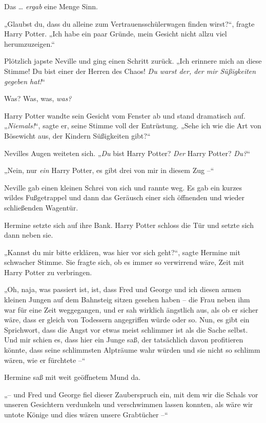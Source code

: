 Das … \emph{ergab} eine Menge Sinn. 

„Glaubst du, dass du alleine zum Vertrauensschülerwagen finden wirst?“, fragte Harry Potter. „Ich habe ein paar Gründe, mein Gesicht nicht allzu viel herumzuzeigen.“ 

Plötzlich japste Neville und ging einen Schritt zurück. „Ich erinnere mich an diese Stimme! Du bist einer der Herren des Chaos! \emph{Du warst der, der mir Süßigkeiten gegeben hat!}“ 

Was? Was, was, \emph{was?} 

Harry Potter wandte sein Gesicht vom Fenster ab und stand dramatisch auf. „\emph{Niemals!}“, sagte er, seine Stimme voll der Entrüstung. „Sehe ich wie die Art von Bösewicht aus, der Kindern Süßigkeiten gibt?“ 

Nevilles Augen weiteten sich. „\emph{Du} bist Harry Potter? \emph{Der} Harry Potter? \emph{Du?}“ 

„Nein, nur \emph{ein} Harry Potter, es gibt drei von mir in diesem Zug –“ 

Neville gab einen kleinen Schrei von sich und rannte weg. Es gab ein kurzes wildes Fußgetrappel und dann das Geräusch einer sich öffnenden und wieder schließenden Wagentür. 

Hermine setzte sich auf ihre Bank. Harry Potter schloss die Tür und setzte sich dann neben sie. 

„Kannst du mir bitte erklären, was hier vor sich geht?“, sagte Hermine mit schwacher Stimme. Sie fragte sich, ob es immer so verwirrend wäre, Zeit mit Harry Potter zu verbringen. 

„Oh, naja, was passiert ist, ist, dass Fred und George und ich diesen armen kleinen Jungen auf dem Bahnsteig sitzen gesehen haben – die Frau neben ihm war für eine Zeit weggegangen, und er sah wirklich ängstlich aus, als ob er sicher wäre, dass er gleich von Todessern angegriffen würde oder so. Nun, es gibt ein Sprichwort, dass die Angst vor etwas meist schlimmer ist als die Sache selbst. Und mir schien es, dass hier ein Junge saß, der tatsächlich davon profitieren könnte, dass seine schlimmsten Alpträume wahr würden und sie nicht so schlimm wären, wie er fürchtete –“ 

Hermine saß mit weit geöffnetem Mund da. 

„– und Fred und George fiel dieser Zauberspruch ein, mit dem wir die Schals vor unseren Gesichtern verdunkeln und verschwimmen lassen konnten, als wäre wir untote Könige und dies wären unsere Grabtücher –“ 

